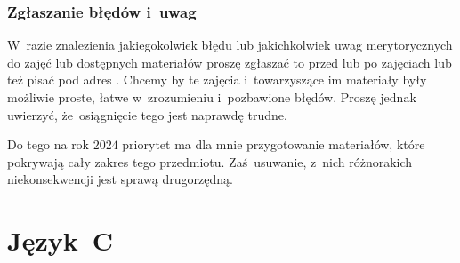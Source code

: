 \documentclass[10pt,t]{beamer}
\begin{document}
\begin{frame}
  \frametitle{Zgłaszanie błędów i~uwag}


  W~razie znalezienia jakiegokolwiek błędu lub jakichkolwiek uwag
  merytorycznych do zajęć lub dostępnych materiałów proszę zgłaszać to
  przed lub po zajęciach lub też pisać pod adres \email. Chcemy by te
  zajęcia i~towarzyszące im materiały były możliwie proste, łatwe
  w~zrozumieniu i~pozbawione błędów. Proszę jednak uwierzyć, że~osiągnięcie
  tego jest naprawdę trudne.

  Do tego na rok $2024$ priorytet ma dla mnie przygotowanie
  materiałów, które pokrywają cały zakres tego przedmiotu. Zaś~usuwanie,
  z~nich różnorakich niekonsekwencji jest sprawą drugorzędną.



\end{frame}










\section{Język~C %
}
\end{document}
